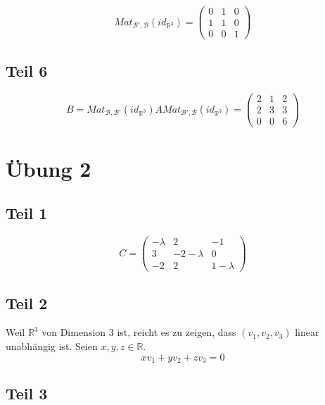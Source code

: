 \documentclass[a4paper,10pt]{article}
\begin{document}
\begin{equation}
 Mat_{\mathcal{B}',\mathcal{B}}(id_{\mathbb{R}^3}) =
  \begin{pmatrix}
   0 & 1 & 0\\
   1 & 1 & 0\\
   0 & 0 & 1
  \end{pmatrix}
\end{equation}

\subsection*{Teil 6}

\begin{equation}
 B = Mat_{\mathcal{B},\mathcal{B}'}(id_{\mathbb{R}^3})AMat_{\mathcal{B}',\mathcal{B}}(id_{\mathbb{R}^3}) = 
  \begin{pmatrix}
   2 & 1 & 2\\
   2 & 3 & 3\\
   0 & 0 & 6
  \end{pmatrix}
\end{equation}

\section*{Übung 2}

\subsection*{Teil 1}

\begin{equation}
 C = 
  \begin{pmatrix}
   -\lambda & 2 & -1\\
   3 & -2 - \lambda & 0\\
   -2 & 2 & 1 - \lambda
  \end{pmatrix}
\end{equation}

\subsection*{Teil 2}

Weil $\mathbb{R}^3$ von Dimension $3$ ist, reicht es zu zeigen, dass $(v_1, v_2, v_3)$ linear unabhängig ist.
Seien $x, y, z \in \mathbb{R}$.
\begin{equation}
 xv_1 + yv_2 + zv_3 = 0
\end{equation}

\subsection*{Teil 3}
\end{document}
